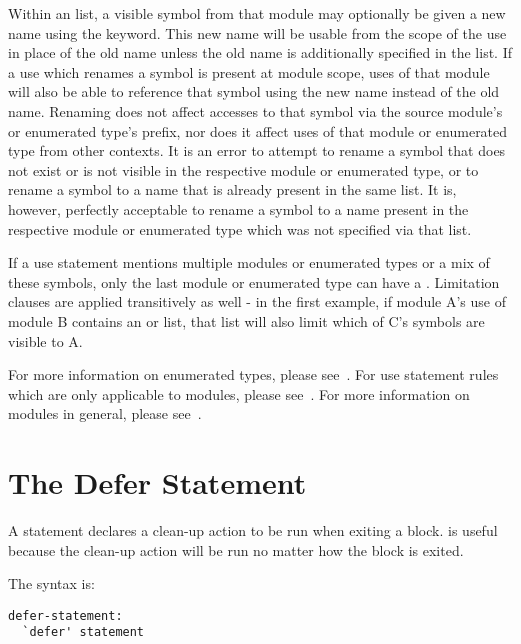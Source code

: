 Within an  list, a visible symbol from that module may optionally be
given a new name using the  keyword.  This new name will be usable from
the scope of the use in place of the old name unless the old name is
additionally specified in the  list.  If a use which renames a symbol
is present at module scope, uses of that module will also be able to reference
that symbol using the new name instead of the old name.  Renaming does not
affect accesses to that symbol via the source module's or enumerated type's
prefix, nor does it affect uses of that module or enumerated type from other
contexts.  It is an error to attempt to rename a symbol that does not exist or
is not visible in the respective module or enumerated type, or to rename a
symbol to a name that is already present in the same  list.  It is,
however, perfectly acceptable to rename a symbol to a name present in the
respective module or enumerated type which was not specified via
that  list.

If a use statement mentions multiple modules or enumerated types or a mix of
these symbols, only the last module or enumerated type can have a
.  Limitation clauses are applied transitively as well
- in the first example, if module A's use of module B contains an 
or  list, that list will also limit which of C's symbols are visible
to A.

For more information on enumerated types, please see~.
For use statement rules which are only applicable to modules, please
see~.  For more information on modules in general, please
see~.


\section{The Defer Statement}
\label{The_Defer_Statement}

A  statement declares a clean-up action to be run when
exiting a block.
 is useful because the clean-up action will be run no
matter how the block is exited.

The syntax is:

\begin{syntax}
\begin{verbatim}
defer-statement:
  `defer' statement
\end{verbatim}
\end{syntax}

